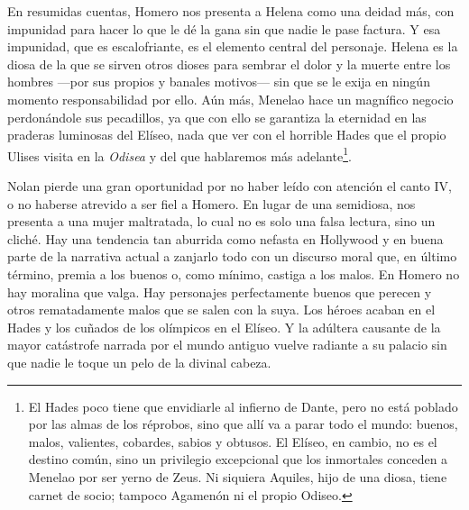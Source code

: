 \documentclass[11pt,a4paper]{article}
\begin{document}
En resumidas cuentas, Homero nos presenta a Helena como una deidad más, con impunidad para hacer lo que le dé la gana sin que nadie le pase factura. Y esa impunidad, que es escalofriante, es el elemento central del personaje. Helena es la diosa de la que se sirven otros dioses para sembrar el dolor y la muerte entre los hombres ---por sus propios y banales motivos--- sin que se le exija en ningún momento responsabilidad por ello. Aún más, Menelao hace un magnífico negocio perdonándole sus pecadillos, ya que con ello se garantiza la eternidad en las praderas luminosas del Elíseo, nada que ver con el horrible Hades que el propio Ulises visita en la \emph{Odisea} y del que hablaremos más adelante\footnote{El Hades poco tiene que envidiarle al infierno de Dante, pero no está poblado por las almas de los réprobos, sino que allí va a parar todo el mundo: buenos, malos, valientes, cobardes, sabios y obtusos. El Elíseo, en cambio, no es el destino común, sino un privilegio excepcional que los inmortales conceden a Menelao por ser yerno de Zeus. Ni siquiera Aquiles, hijo de una diosa, tiene carnet de socio; tampoco Agamenón ni el propio Odiseo.}.

Nolan pierde una gran oportunidad por no haber leído con atención el canto IV, o no haberse atrevido a ser fiel a Homero. En lugar de una semidiosa, nos presenta a una mujer maltratada, lo cual no es solo una falsa lectura, sino un cliché.
Hay una tendencia tan aburrida como nefasta en Hollywood y en buena parte de la narrativa actual a zanjarlo todo con un discurso moral que, en último término, premia a los buenos o, como mínimo, castiga a los malos. En Homero no hay moralina que valga. Hay personajes perfectamente buenos que perecen y otros rematadamente malos que se salen con la suya. Los héroes acaban en el Hades y los cuñados de los olímpicos en el Elíseo. Y la adúltera causante de la mayor catástrofe narrada por el mundo antiguo vuelve radiante a su palacio sin que nadie le toque un pelo de la divinal cabeza.
\end{document}
